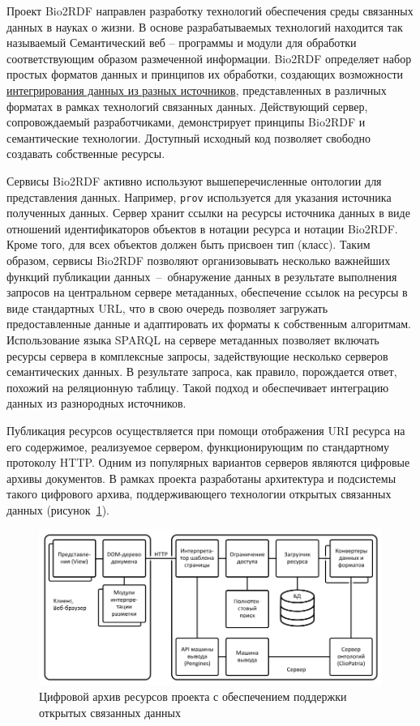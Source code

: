 \documentclass[a4paper,12pt,openany,final]{extreport}
\def\oldcaption{} \let\oldcaption=\caption
\def\caption{\stepcounter{captionsnum}\oldcaption}
\begin{document}
Проект Bio2RDF направлен разработку технологий обеспечения среды связанных данных в науках о жизни. В основе разрабатываемых технологий находится так называемый Семантический веб -- программы и модули для обработки соответствующим образом размеченной информации. Bio2RDF определяет набор простых форматов данных и принципов их обработки, создающих возможности \href{https://docs.google.com/presentation/d/1SG6PFew2CPK1o_jRCYx30DFnuGEEr0uWVKPnz7Uqw5k/pub?start=false\&loop=false\&delayms=3000\&slide=id.p}{интегрирования данных из разных источников}, представленных в различных форматах в рамках технологий связанных данных. Действующий сервер, сопровождаемый разработчиками, демонстрирует принципы Bio2RDF и семантические технологии. Доступный исходный код позволяет свободно создавать собственные ресурсы.

Сервисы Bio2RDF активно используют вышеперечисленные онтологии для представления данных. Например, \texttt{prov} используется для указания источника полученных данных. Сервер хранит ссылки на ресурсы источника данных в виде отношений идентификаторов объектов в нотации ресурса и нотации Bio2RDF. Кроме того, для всех объектов должен быть присвоен тип (класс).  Таким образом, сервисы Bio2RDF позволяют организовывать несколько важнейших функций публикации данных~--~обнаружение данных в результате выполнения запросов на центральном сервере метаданных, обеспечение ссылок на ресурсы в виде стандартных URL, что в свою очередь позволяет загружать предоставленные данные и адаптировать их форматы к собственным алгоритмам. Использование языка SPARQL на сервере метаданных позволяет включать ресурсы сервера в комплексные запросы, задействующие несколько серверов семантических данных. В результате запроса, как правило, порождается ответ, похожий на реляционную таблицу. Такой подход и обеспечивает интеграцию данных из разнородных источников.

Публикация ресурсов осуществляется при помощи отображения URI ресурса на его содержимое, реализуемое сервером, функционирующим по стандартному протоколу HTTP.  Одним из популярных вариантов серверов являются цифровые архивы документов. В рамках проекта разработаны архитектура и подсистемы такого цифрового архива, поддерживающего технологии открытых связанных данных (рисунок~\ref{fig:digital}).

\begin{figure}[b!]\centering
\includegraphics[width=0.8\linewidth]{media/image18.png}

\caption{Цифровой архив ресурсов проекта с обеспечением поддержки открытых связанных данных}\label{fig:digital}
\end{figure}
\end{document}
